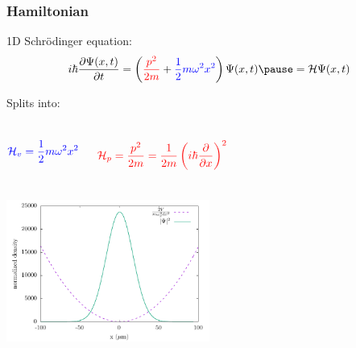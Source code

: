 \documentclass{beamer}
\begin{document}
\begin{frame}
\frametitle{Hamiltonian}
1D Schr\"odinger equation:
\begin{equation*}
i\hbar \frac{\partial \Psi(x, t)}{\partial t} = \left({\color{red}{\frac{ p^2}{2m}}} + {\color{blue}{\frac{1}{2}m\omega^2x^2}} \right)\Psi(x,t) \pause = \mathcal{H} \Psi(x,t)
\end{equation*}

Splits into:
\begin{columns}
$$
\color{blue}{\mathcal{H}_v = \frac{1}{2}m\omega^2x^2}
$$

\vspace{-0.8cm}
$$
\color{red}{\mathcal{ H}_p = \frac{p^2}{2m} = \frac{1}{2m}\left(i\hbar \frac{\partial}{\partial x}\right)^2}
$$
\end{columns}

\begin{center}
\includegraphics[width=0.5\textwidth]{../data/qs/SHO/SHO_2.pdf}
\end{center}
\end{frame}
\end{document}
